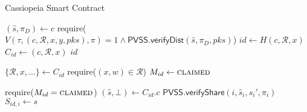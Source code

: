 \begin{algorithm}[H]
\caption{Cassiopeia Smart Contract}
\label{cassiopeia_no_incentives}
    \begin{algorithmic}[1]
            
            \EndFunction
            
                \State $(\hat{s}, \pi_D) \gets c$
                \State require($V(\tau, (c, \mathcal{R}, x, y, pks), \pi) = 1 \land \textsf{PVSS.verifyDist}(\hat{s}, \pi_D, pks)$)
                \State $id \gets H(c, \mathcal{R}, x)$
                \State $C_{id} \gets (c, \mathcal{R}, x)$
                \State \Return $id$
            \EndFunction
            
                \State $\{\mathcal{R}, x, \dots\} \gets C_{id}$
                \State require($(x, w) \in \mathcal{R}$)
                \State $M_{id} \gets \textsc{claimed}$
            \EndFunction
            
                \State require($M_{id} = \textsc{claimed}$)
                \State $(\hat{s}, \bot) \gets C_{id}.c$
                \State $\textsf{PVSS.verifyShare}(i, \hat{s}_i, s_i', \pi_i)$
                \State $S_{id,i} \gets s$
            \EndFunction
        \EndContract
    \end{algorithmic}
\end{algorithm}
